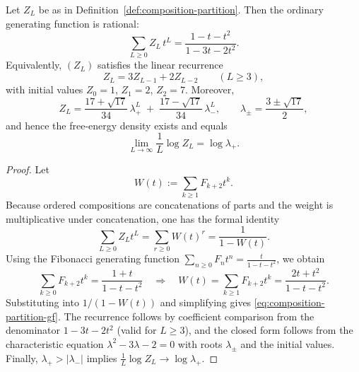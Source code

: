 \begin{proposition}\label{prop:composition-partition-sqrt17}
Let $Z_L$ be as in Definition~\ref{def:composition-partition}.
Then the ordinary generating function is rational:
\begin{equation}\label{eq:composition-partition-gf}
\boxed{\;
\sum_{L\ge 0} Z_L\,t^L=\frac{1-t-t^2}{1-3t-2t^2}.\;}
\end{equation}
Equivalently, $(Z_L)$ satisfies the linear recurrence
\[
\boxed{\;
Z_L=3Z_{L-1}+2Z_{L-2}\qquad(L\ge 3),\;}
\]
with initial values $Z_0=1$, $Z_1=2$, $Z_2=7$.
Moreover,
\[
Z_L=\frac{17+\sqrt{17}}{34}\,\lambda_+^{L}
\;+\;
\frac{17-\sqrt{17}}{34}\,\lambda_-^{L},
\qquad
\lambda_\pm=\frac{3\pm\sqrt{17}}{2},
\]
and hence the free-energy density exists and equals
\[
\boxed{\;
\lim_{L\to\infty}\frac{1}{L}\log Z_L=\log \lambda_+.\;}
\]
\end{proposition}
\begin{proof}
Let
\[
W(t):=\sum_{k\ge 1}F_{k+2}t^k.
\]
Because ordered compositions are concatenations of parts and the weight is multiplicative under concatenation, one has the formal identity
\[
\sum_{L\ge 0}Z_L t^L=\sum_{r\ge 0} W(t)^r=\frac{1}{1-W(t)}.
\]
Using the Fibonacci generating function $\sum_{n\ge 0}F_n t^n=\frac{t}{1-t-t^2}$, we obtain
\[
\sum_{k\ge 0}F_{k+2}t^k=\frac{1+t}{1-t-t^2}
\quad\Longrightarrow\quad
W(t)=\sum_{k\ge 1}F_{k+2}t^k=\frac{2t+t^2}{1-t-t^2}.
\]
Substituting into $1/(1-W(t))$ and simplifying gives \eqref{eq:composition-partition-gf}.
The recurrence follows by coefficient comparison from the denominator $1-3t-2t^2$ (valid for $L\ge 3$), and the closed form follows from the characteristic equation $\lambda^2-3\lambda-2=0$ with roots $\lambda_\pm$ and the initial values.
Finally, $\lambda_+>|\lambda_-|$ implies $\frac{1}{L}\log Z_L\to \log\lambda_+$.
\end{proof}

